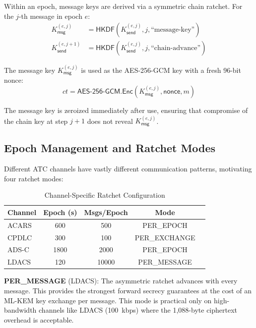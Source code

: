 \documentclass[conference,10pt]{IEEEtran}
\begin{document}
Within an epoch, message keys are derived via a symmetric chain ratchet. For the $j$-th message in epoch $e$:
\begin{align}
    K_{\mathsf{msg}}^{(e,j)} &= \mathsf{HKDF}(K_{\mathsf{send}}^{(e,j)}, j, \text{``message-key''}) \label{eq:msg_key} \\
    K_{\mathsf{send}}^{(e,j+1)} &= \mathsf{HKDF}(K_{\mathsf{send}}^{(e,j)}, j, \text{``chain-advance''}) \label{eq:chain_advance}
\end{align}

The message key $K_{\mathsf{msg}}^{(e,j)}$ is used as the AES-256-GCM key with a fresh 96-bit nonce:
\begin{equation}
    ct = \mathsf{AES\text{-}256\text{-}GCM.Enc}(K_{\mathsf{msg}}^{(e,j)}, \mathsf{nonce}, m)
\end{equation}

The message key is zeroized immediately after use, ensuring that compromise of the chain key at step $j+1$ does not reveal $K_{\mathsf{msg}}^{(e,j)}$.

\subsection{Epoch Management and Ratchet Modes}

Different ATC channels have vastly different communication patterns, motivating four ratchet modes:

\begin{table}[t]
\centering
\caption{Channel-Specific Ratchet Configuration}
\label{tab:ratchet_config}
\begin{tabular}{lcccc}
\toprule
\textbf{Channel} & \textbf{Epoch (s)} & \textbf{Msgs/Epoch} & \textbf{Mode} \\
\midrule
ACARS & 600 & 500 & PER\_EPOCH \\
CPDLC & 300 & 100 & PER\_EXCHANGE \\
ADS-C & 1800 & 2000 & PER\_EPOCH \\
LDACS & 120 & 10000 & PER\_MESSAGE \\
\bottomrule
\end{tabular}
\end{table}

\textbf{PER\_MESSAGE} (LDACS): The asymmetric ratchet advances with every message. This provides the strongest forward secrecy guarantees at the cost of an ML-KEM key exchange per message. This mode is practical only on high-bandwidth channels like LDACS (100~kbps) where the 1,088-byte ciphertext overhead is acceptable.
\end{document}
